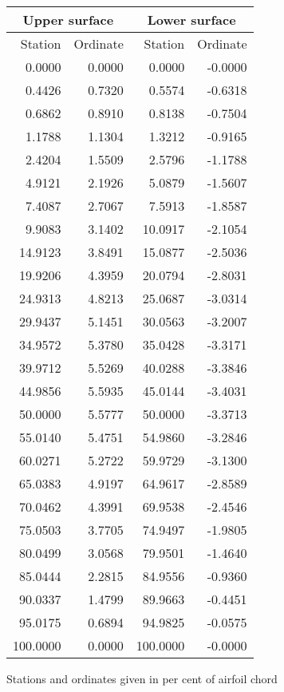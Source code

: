 \documentclass[11pt]{book}
\begin{document}
 \hspace{4mm}
 \begin{tabular}{|r|r|r|r|} \hline 
 \multicolumn{2}{|c|}{Upper surface} & \multicolumn{2}{|c|}{Lower surface} \\
 \hline
 Station & Ordinate & Station & Ordinate \\
 \hline
0.0000 & 0.0000 & 0.0000 & -0.0000 \\
0.4426 & 0.7320 & 0.5574 & -0.6318 \\
0.6862 & 0.8910 & 0.8138 & -0.7504 \\
1.1788 & 1.1304 & 1.3212 & -0.9165 \\
2.4204 & 1.5509 & 2.5796 & -1.1788 \\
4.9121 & 2.1926 & 5.0879 & -1.5607 \\
7.4087 & 2.7067 & 7.5913 & -1.8587 \\
9.9083 & 3.1402 & 10.0917 & -2.1054 \\
14.9123 & 3.8491 & 15.0877 & -2.5036 \\
19.9206 & 4.3959 & 20.0794 & -2.8031 \\
24.9313 & 4.8213 & 25.0687 & -3.0314 \\
29.9437 & 5.1451 & 30.0563 & -3.2007 \\
34.9572 & 5.3780 & 35.0428 & -3.3171 \\
39.9712 & 5.5269 & 40.0288 & -3.3846 \\
44.9856 & 5.5935 & 45.0144 & -3.4031 \\
50.0000 & 5.5777 & 50.0000 & -3.3713 \\
55.0140 & 5.4751 & 54.9860 & -3.2846 \\
60.0271 & 5.2722 & 59.9729 & -3.1300 \\
65.0383 & 4.9197 & 64.9617 & -2.8589 \\
70.0462 & 4.3991 & 69.9538 & -2.4546 \\
75.0503 & 3.7705 & 74.9497 & -1.9805 \\
80.0499 & 3.0568 & 79.9501 & -1.4640 \\
85.0444 & 2.2815 & 84.9556 & -0.9360 \\
90.0337 & 1.4799 & 89.9663 & -0.4451 \\
95.0175 & 0.6894 & 94.9825 & -0.0575 \\
100.0000 & 0.0000 & 100.0000 & -0.0000 \\
 \hline 
 \end{tabular}
 \vspace{8mm}

Stations and ordinates given in per cent of airfoil chord
\end{document}
